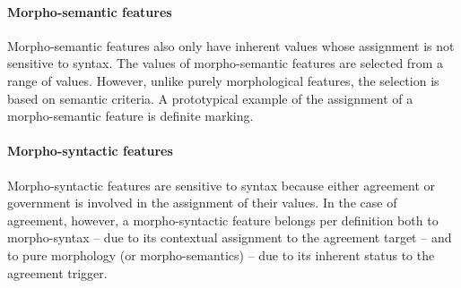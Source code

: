 \paragraph{Morpho-semantic features} Morpho-semantic features also only have inherent values whose assignment is not sensitive to syntax. The values of morpho-semantic features are selected from a range of values. However, unlike purely morphological features, the selection is based on semantic criteria. A prototypical example of the assignment of a morpho-semantic feature is definite marking.
\paragraph{Morpho-syntactic features} Morpho-syntactic features are sensitive to syntax because either agreement or government is involved in the assignment of their values. In the case of agreement, however, a morpho-syntactic feature belongs per definition both to morpho-syntax – due to its contextual assignment to the agreement target – and to pure morphology (or morpho-semantics) – due to its inherent status to the agreement trigger.

